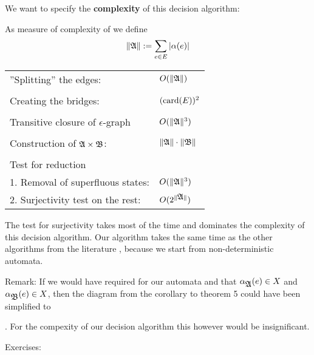 We want to specify the {\bf complexity} of this decision algorithm:

As measure of complexity of  we define 
\[ \|\mbox{$\mathfrak{A}$}\| := \sum_{e \in E} |\alpha(e)| \]

\begin{tabular}{ll}
  ''Splitting'' the edges: & $O(\|\mbox{$\mathfrak{A}$}\|)$ \\  \\
  Creating the bridges: & $(\mathrm{card}({E}))^2$ \\ \\
  Transitive closure of $\epsilon$-graph & $O(\|\mbox{$\mathfrak{A}$}\|^3)$ \\  \\
  Construction of $\mbox{$\mathfrak{A}$} \times \mbox{$\mathfrak{B}$}$: & $\|\mbox{$\mathfrak{A}$}\| \cdot \|\mbox{$\mathfrak{B}$}\|$ \\ \\
  Test for reduction \\
  1. Removal of superfluous states: & $O(\|\mbox{$\mathfrak{A}$}\|^3)$ \\
  2. Surjectivity test on the rest: & $O(2^{\|\mbox{$\mathfrak{A}$}\|})$
\end{tabular}

The test for surjectivity takes most of the time and dominates the complexity of
this decision algorithm. Our algorithm takes the same time as the other
algorithms from the literature \cite{AHU}, because we start from
non-deterministic automata.

Remark: If we would have required for our automata  and  that
$\alpha_{\mbox{$\mathfrak{A}$}}(e) \in X$ and $\alpha_{\mbox{$\mathfrak{B}$}}(e) \in X$, then the diagram from
the corollary to theorem 5 could have been simplified to . For the compexity of
our decision algorithm this however would be insignificant.

Exercises:

